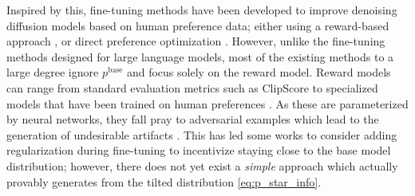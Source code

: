 \documentclass[]{fairmeta}
\begin{document}
Inspired by this,
fine-tuning methods have been developed to improve denoising diffusion models based on human preference data; either using a reward-based approach \citep{fan2023optimizing,black2024training,fan2023dpok,xu2023imagereward,clark2024directly,uehara2024understanding,uehara2024finetuning},
or direct preference optimization \citep{wallace2023diffusion}. 
However, unlike the fine-tuning methods designed for large language models,
most of the existing methods to a large degree ignore $p^\text{base}$ and focus solely on the reward model.
Reward models can range from standard evaluation metrics such as ClipScore \citep{hessel2021clipscore,kirstain2023pickapic} to specialized models that have been trained on human preferences \citep{schuhmann2022laion,xu2023imagereward,wu2023humanpreferencescorev2}. As these are parameterized by neural networks, they fall pray to adversarial examples which lead to the generation of undesirable artifacts \citep{goodfellow2014explaining,mordvintsev2015inceptionism}. This has led some works to consider adding regularization during fine-tuning \citep{fan2024reinforcement,uehara2024finetuning} to incentivize staying close to the base model distribution; however, there does not yet exist a \emph{simple} approach which actually provably generates from the tilted distribution \eqref{eq:p_star_info}. 
\end{document}
